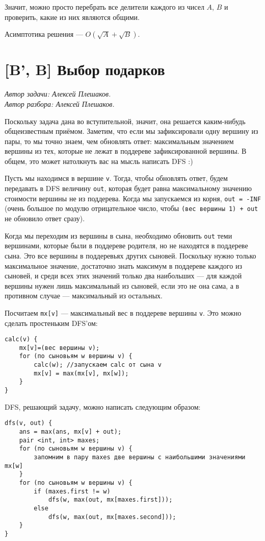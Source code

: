 \documentclass[12pt]{article}
\theoremstyle{definition}
\begin{document}
Значит, можно просто перебрать все делители каждого из чисел $A$, $B$ и проверить, какие из них являются общими.

Асимптотика решения --- $O(\sqrt{A} + \sqrt{B})$.

\section{[B', B] Выбор подарков}
\textit{Автор задачи: Алексей Плешаков.} \\
\textit{Автор разбора: Алексей Плешаков.}

Поскольку задача дана во вступительной, значит, она решается каким-нибудь общеизвестным приёмом. Заметим, что если мы зафиксировали одну вершину из пары, то мы точно знаем, чем обновлять ответ: максимальным значением вершины из тех, которые не лежат в поддереве зафиксированной вершины. В общем, это может натолкнуть вас на мысль написать DFS :)

Пусть мы находимся в вершине \verb|v|. Тогда, чтобы обновлять ответ, будем передавать в DFS величину \verb|out|, которая будет равна максимальному значению стоимости вершины не из поддерева. Когда мы запускаемся из корня, \verb|out = -INF| (очень большое по модулю отрицательное число, чтобы \verb|(вес вершины 1) + out| не обновило ответ сразу).

Когда мы переходим из вершины в сына, необходимо обновить \verb|out| теми вершинами, которые были в поддереве родителя, но не находятся в поддереве сына. Это все вершины в поддеревьях других сыновей. Поскольку нужно только максимальное значение, достаточно знать максимум в поддереве каждого из сыновей, и среди всех этих значений только два наибольших --- для каждой вершины нужен лишь максимальный из сыновей, если это не она сама, а в противном случае --- максимальный из остальных.

Посчитаем \verb|mx[v]| --- максимальный вес в поддереве вершины \verb|v|. Это можно сделать простеньким DFS'ом:
\begin{verbatim}
calc(v) {
    mx[v]=(вес вершины v);
    for (по сыновьям w вершины v) {
        calc(w); //запускаем calc от сына v
        mx[v] = max(mx[v], mx[w]);	
    }
} 
\end{verbatim}

DFS, решающий задачу, можно написать следующим образом:
\begin{verbatim}
dfs(v, out) {
    ans = max(ans, mx[v] + out);
    pair <int, int> maxes;
    for (по сыновьям w вершины v) {
        запомним в пару maxes две вершины с наибольшими значениями mx[w]
    }
    for (по сыновьям w вершины v) {
        if (maxes.first != w)
            dfs(w, max(out, mx[maxes.first]));
        else
            dfs(w, max(out, mx[maxes.second]));
    }
}
\end{verbatim}
\end{document}
